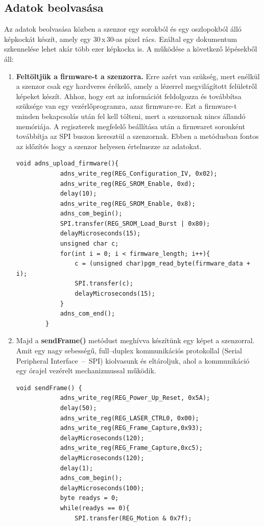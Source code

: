 \documentclass[]{thesis-ekf}
\theoremstyle{definition}
\theoremstyle{remark}
\begin{document}
\subsection{Adatok beolvasása}
Az adatok beolvasása közben a szenzor egy sorokból és egy oszlopokból álló képkockát készít, amely egy 30\,x\,30-as pixel rács. Ezáltal egy dokumentum szkennelése lehet akár több ezer képkocka is.
A működése a következő lépésekből áll:
\begin{enumerate}
	\item \textbf{Feltöltjük a firmware-t a szenzorra.} Erre azért van szükség, mert enélkül a szenzor csak egy hardveres érékelő, amely a lézerrel megvilágított felületről képeket készít. Ahhoz, hogy ezt az információt feldolgozza és továbbítsa szüksége van egy vezérlőprogramra, azaz firmware-re. Ezt a firmware-t minden bekapcsolás után fel kell tölteni, mert a szenzornak nincs állandó memóriája. A regiszterek megfelelő beállítása után a firmwaret soronként továbbítja  az SPI buszon keresztül a szenzornak. Ebben a metódusban fontos az időzítés hogy a szenzor helyesen értelmezze az adatokat.
	\begin{lstlisting}[language=Arduino,label=upload-firmware-code]
		void adns_upload_firmware(){
			adns_write_reg(REG_Configuration_IV, 0x02);	
			adns_write_reg(REG_SROM_Enable, 0xd); 
			delay(10); 
			adns_write_reg(REG_SROM_Enable, 0x8); 
			adns_com_begin();
			SPI.transfer(REG_SROM_Load_Burst | 0x80); 
			delayMicroseconds(15);
			unsigned char c;
			for(int i = 0; i < firmware_length; i++){ 
				c = (unsigned char)pgm_read_byte(firmware_data + i);
				SPI.transfer(c);
				delayMicroseconds(15); 
			}
			adns_com_end();
		}
	\end{lstlisting}
	\item Majd a \textbf{sendFrame()} metódust meghívva készítünk egy képet a szenzorral. Amit egy nagy sebességű, full--duplex kommunikációs protokollal (Serial Peripheral Interface~--~SPI) kiolvasunk és eltároljuk, ahol a kommunikáció egy órajel vezérelt mechanizmussal működik. 
	\begin{lstlisting}[language=Arduino,label=sendFrame]
		void sendFrame() {
			adns_write_reg(REG_Power_Up_Reset, 0x5A);
			delay(50);
			adns_write_reg(REG_LASER_CTRL0, 0x00);
			adns_write_reg(REG_Frame_Capture,0x93);
			delayMicroseconds(120); 
			adns_write_reg(REG_Frame_Capture,0xc5);
			delayMicroseconds(120); 
			delay(1); 
			adns_com_begin(); 
			delayMicroseconds(100); 
			byte readys = 0;
			while(readys == 0){
				SPI.transfer(REG_Motion & 0x7f);

\end{lstlisting}
\end{enumerate}
\end{document}
